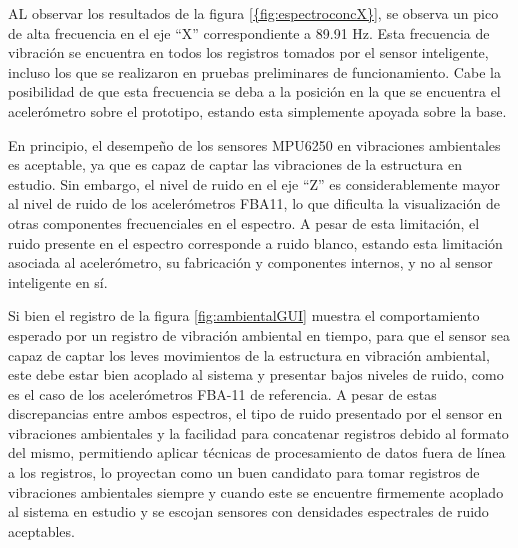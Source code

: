 AL observar los resultados de la figura \ref{{fig:espectroconcX}}, se observa un pico de alta frecuencia en el eje ``X'' correspondiente a 89.91 Hz. Esta frecuencia de vibración se encuentra en todos los registros tomados por el sensor inteligente, incluso los que se realizaron en pruebas preliminares de funcionamiento. Cabe la posibilidad de que esta frecuencia se deba a la posición en la que se encuentra el acelerómetro sobre el prototipo, estando esta simplemente apoyada sobre la base. 

En principio, el desempeño de los sensores MPU6250 en vibraciones ambientales es aceptable, ya que es capaz de captar las vibraciones de la estructura en estudio. Sin embargo, el nivel de ruido en el eje ``Z'' es considerablemente mayor al nivel de ruido de los acelerómetros FBA11, lo que dificulta la visualización de otras componentes frecuenciales en el espectro. A pesar de esta limitación, el ruido presente en el espectro corresponde a ruido blanco, estando esta limitación asociada al acelerómetro, su fabricación y componentes internos, y no al sensor inteligente en sí.

 Si bien el registro de la figura \ref{fig:ambientalGUI} muestra el comportamiento esperado por un registro de vibración ambiental en tiempo, para que el sensor sea capaz de captar los leves movimientos de la estructura en vibración ambiental, este debe estar bien acoplado al sistema y presentar bajos niveles de ruido, como es el caso de los acelerómetros FBA-11 de referencia. A pesar de estas discrepancias entre ambos espectros, el tipo de ruido presentado por el sensor en vibraciones ambientales y la facilidad para concatenar registros debido al formato del mismo, permitiendo aplicar técnicas de procesamiento de datos fuera de línea a los registros, lo proyectan como un buen candidato para tomar registros de vibraciones ambientales siempre y cuando este se encuentre firmemente acoplado al sistema en estudio y se escojan sensores con densidades espectrales de ruido aceptables.
